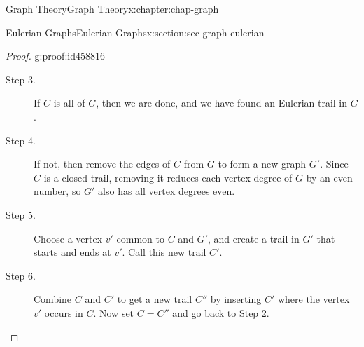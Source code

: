 \documentclass[oneside,10pt,]{book}
\numberwithin{equation}{section}
\begin{document}
\begin{chapterptx}{Graph Theory}{}{Graph Theory}{}{}{x:chapter:chap-graph}
\begin{sectionptx}{Eulerian Graphs}{}{Eulerian Graphs}{}{}{x:section:sec-graph-eulerian}
\begin{proof}{}{g:proof:id458816}
\begin{description}
\item[{Step 3.}]If \(C\) is all of \(G\), then we are done, and we have found an Eulerian trail in \(G\).%
\item[{Step 4.}]If not, then remove the edges of \(C\) from \(G\) to form a new graph \(G'\). Since \(C\) is a closed trail, removing it reduces each vertex degree of \(G\) by an even number, so \(G'\) also has all vertex degrees even.%
\item[{Step 5.}]Choose a vertex \(v'\) common to \(C\) and \(G'\), and create a trail in \(G'\) that starts and ends at \(v'\). Call this new trail \(C'\).%
\item[{Step 6.}]Combine \(C\) and \(C'\) to get a new trail \(C''\) by inserting \(C'\) where the vertex \(v'\) occurs in \(C\). Now set \(C = C''\) and go back to Step 2.%
\end{description}
%
\begin{sidebyside}{3}{0.0466666666666667}{0.0466666666666667}{0.0933333333333333}%
\begin{sbspanel}{0.24}%
\end{sbspanel}
\end{sidebyside}
\end{proof}
\end{sectionptx}
\end{chapterptx}
\end{document}
